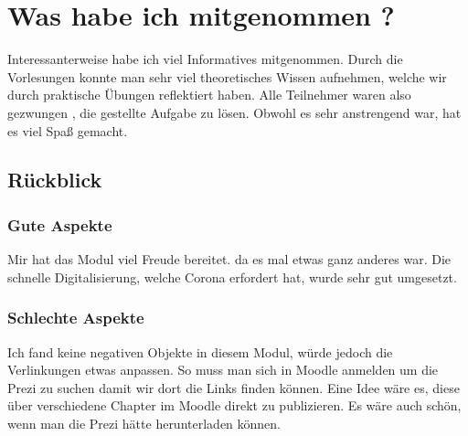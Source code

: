 \chapter{Was habe ich mitgenommen ?}

Interessanterweise habe ich viel Informatives mitgenommen. Durch die Vorlesungen konnte man sehr viel theoretisches Wissen aufnehmen, welche wir durch praktische Übungen reflektiert haben. Alle Teilnehmer waren also \dq gezwungen \dq , die gestellte Aufgabe zu lösen. Obwohl es sehr anstrengend war, hat es viel Spaß gemacht. 




\section{Rückblick}
\subsection{Gute Aspekte}
Mir hat das Modul viel Freude bereitet. da es mal etwas ganz anderes war. Die schnelle Digitalisierung, welche Corona erfordert hat, wurde sehr gut umgesetzt. 


\subsection{Schlechte Aspekte}
Ich fand keine negativen Objekte in diesem Modul, würde jedoch die Verlinkungen etwas anpassen. So muss man sich in Moodle anmelden um die Prezi zu suchen damit wir dort die Links finden können. Eine Idee wäre es, diese über verschiedene Chapter im Moodle direkt zu publizieren. Es wäre auch schön, wenn man die Prezi hätte herunterladen können.

